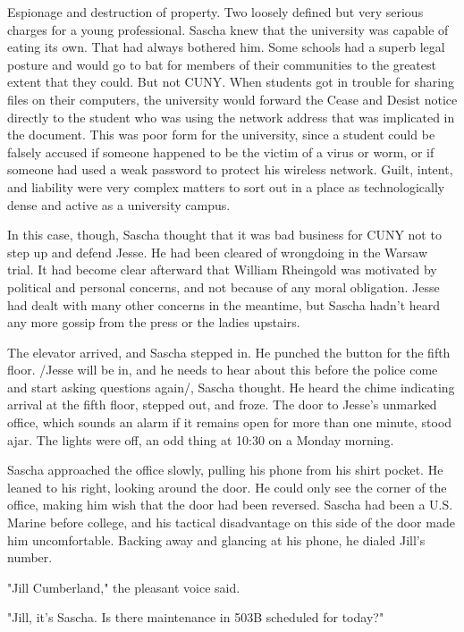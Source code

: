 Espionage and destruction of property.  Two loosely defined but very serious charges for a young professional.  Sascha knew that the university was capable of eating its own.  That had always bothered him.  Some schools had a superb legal posture and would go to bat for members of their communities to the greatest extent that they could.  But not CUNY.  When students got in trouble for sharing files on their computers, the university would forward the Cease and Desist notice directly to the student who was using the network address that was implicated in the document.  This was poor form for the university, since a student could be falsely accused if someone happened to be the victim of a virus or worm, or if someone had used a weak password to protect his wireless network.  Guilt, intent, and liability were very complex matters to sort out in a place as technologically dense and active as a university campus.

In this case, though, Sascha thought that it was bad business for CUNY not to step up and defend Jesse.  He had been cleared of wrongdoing in the Warsaw trial.  It had become clear afterward that William Rheingold was motivated by political and personal concerns, and not because of any moral obligation.  Jesse had dealt with many other concerns in the meantime, but Sascha hadn't heard any more gossip from the press or the ladies upstairs.

The elevator arrived, and Sascha stepped in.  He punched the button for the fifth floor.  /Jesse will be in, and he needs to hear about this before the police come and start asking questions again/, Sascha thought.  He heard the chime indicating arrival at the fifth floor, stepped out, and froze.  The door to Jesse's unmarked office, which sounds an alarm if it remains open for more than one minute, stood ajar.  The lights were off, an odd thing at 10:30 on a Monday morning.

Sascha approached the office slowly, pulling his phone from his shirt pocket.  He leaned to his right, looking around the door.  He could only see the corner of the office, making him wish that the door had been reversed.  Sascha had been a U.S. Marine before college, and his tactical disadvantage on this side of the door made him uncomfortable.  Backing away and glancing at his phone, he dialed Jill's number.

"Jill Cumberland," the pleasant voice said.

"Jill, it's Sascha.  Is there maintenance in 503B scheduled for today?"

